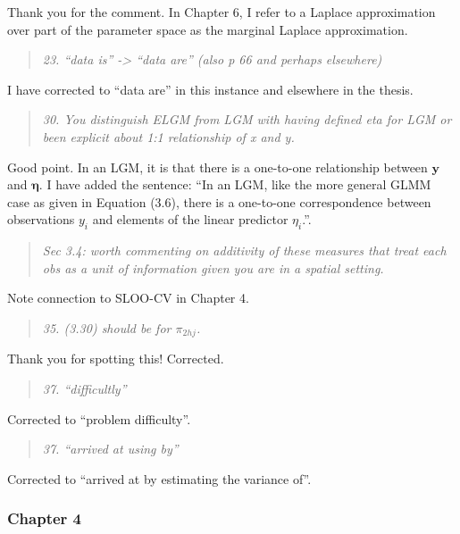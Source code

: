 \documentclass[
  12pt,
]{article}
\begin{document}
Thank you for the comment. In Chapter 6, I refer to a Laplace
approximation over part of the parameter space as the marginal Laplace
approximation.

\begin{quote}
\emph{23. ``data is'' -\textgreater{} ``data are'' (also p 66 and
perhaps elsewhere)}
\end{quote}

I have corrected to ``data are'' in this instance and elsewhere in the
thesis.

\begin{quote}
\emph{30. You distinguish ELGM from LGM with having defined eta for LGM
or been explicit about 1:1 relationship of x and y.}
\end{quote}

Good point. In an LGM, it is that there is a one-to-one relationship
between \(\mathbf{y}\) and \(\boldsymbol{\mathbf{\eta}}\). I have added
the sentence: ``In an LGM, like the more general GLMM case as given in
Equation (3.6), there is a one-to-one correspondence between
observations \(y_i\) and elements of the linear predictor \(\eta_i\).''.

\begin{quote}
\emph{Sec 3.4: worth commenting on additivity of these measures that
treat each obs as a unit of information given you are in a spatial
setting.}
\end{quote}

Note connection to SLOO-CV in Chapter 4.

\begin{quote}
\emph{35. (3.30) should be for \(\pi_{2hj}\).}
\end{quote}

Thank you for spotting this! Corrected.

\begin{quote}
\emph{37. ``difficultly''}
\end{quote}

Corrected to ``problem difficulty''.

\begin{quote}
\emph{37. ``arrived at using by''}
\end{quote}

Corrected to ``arrived at by estimating the variance of''.

\subsubsection{Chapter 4}\label{chapter-4-1}
\end{document}
